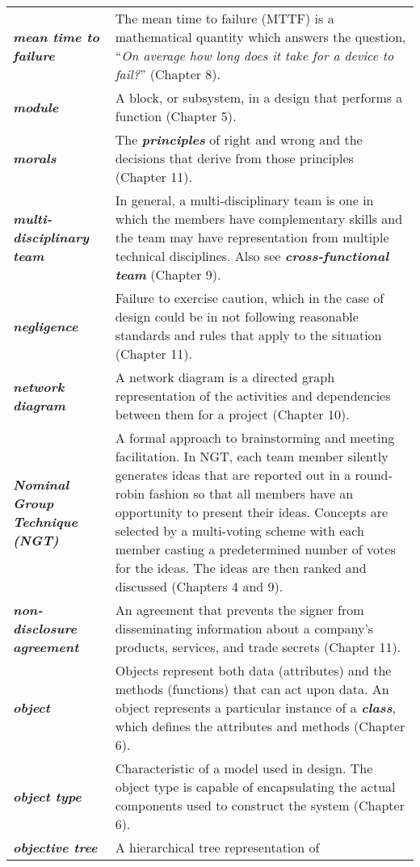 \begin{longtable} { p{4cm} p{11cm}}
\emph{\textbf{mean time to failure}} & The mean time to failure (MTTF)
is a mathematical quantity which answers the question, ``\emph{On
average how long does it take for a device to fail?}'' (Chapter 8). \\
\emph{\textbf{module}} & A block, or subsystem, in a design that
performs a function (Chapter 5). \\
\emph{\textbf{morals}} & The \emph{\textbf{principles}} of right and
wrong and the decisions that derive from those principles (Chapter
11). \\
\emph{\textbf{multi-disciplinary team}} & In general, a
multi-disciplinary team is one in which the members have complementary
skills and the team may have representation from multiple technical
disciplines. Also see \emph{\textbf{cross-functional team}} (Chapter
9). \\
\emph{\textbf{negligence}} & Failure to exercise caution, which in the
case of design could be in not following reasonable standards and rules
that apply to the situation (Chapter 11). \\
\emph{\textbf{network diagram}} & A network diagram is a directed graph
representation of the activities and dependencies between them for a
project (Chapter 10). \\
\emph{\textbf{Nominal Group Technique (NGT)}} & A formal approach to
brainstorming and meeting facilitation. In NGT, each team member
silently generates ideas that are reported out in a round-robin fashion
so that all members have an opportunity to present their ideas. Concepts
are selected by a multi-voting scheme with each member casting a
predetermined number of votes for the ideas. The ideas are then ranked
and discussed (Chapters 4 and 9). \\
\emph{\textbf{non-disclosure agreement}} & An agreement that prevents
the signer from disseminating information about a company's products,
services, and trade secrets (Chapter 11). \\
\emph{\textbf{object}} & Objects represent both data (attributes) and
the methods (functions) that can act upon data. An object represents a
particular instance of a \emph{\textbf{class}}, which defines the
attributes and methods (Chapter 6). \\
\emph{\textbf{object type}} & Characteristic of a model used in design.
The object type is capable of encapsulating the actual components used
to construct the system (Chapter 6). \\
\emph{\textbf{objective tree}} & A hierarchical tree representation of

\end{longtable}
